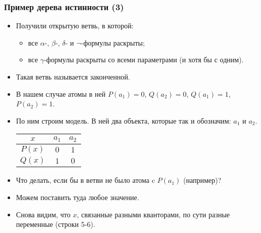 \documentclass[10pt]{beamer}
\begin{document}
\begin{frame}
\frametitle{Пример дерева истинности (3)}
\begin{itemize}
    \item Получили открытую ветвь, в которой: 
    \begin{itemize}
        \item все $\alpha$-, $\beta$-, $\delta$- и $\neg$-формулы раскрыты;
        \item все $\gamma$-формулы раскрыты со всеми параметрами (и хотя бы с одним).
    \end{itemize}
    \item Такая ветвь называется законченной. \pause
    \item В нашем случае атомы в ней $P(a_1) = 0$, $Q(a_2) = 0$, $Q(a_1) = 1$, $P(a_2) = 1$.
    \item По ним строим модель. В ней два объекта, которые так и обозначим: $a_1$ и $a_2$. \\ \pause
    \begin{tabular}{|c | c c |}
    \hline
    $x$ & $a_1$ & $a_2$ \\
    \hline
    $P(x)$ & $0$ & $1$ \\
    \hline
    $Q(x)$ & $1$ & $0$ \\
    \hline
    \end{tabular} \pause
    \item Что делать, если бы в ветви не было атома c $P(a_1)$ (например)? \pause
    \item Можем поставить туда любое значение. \pause
    \item Снова видим, что $x$, связанные разными кванторами, по сути разные переменные (строки 5-6).
\end{itemize}
\end{frame}
\end{document}
